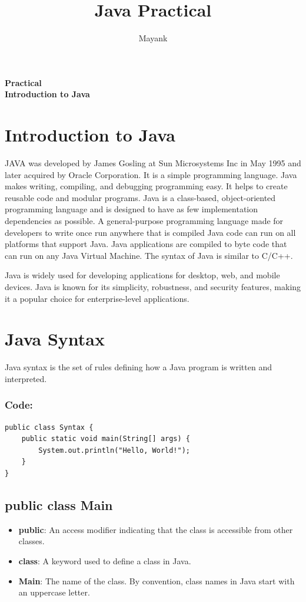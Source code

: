 \documentclass[a4paper,12pt]{article}
\title{\textbf{Java Practical}}
\author{Mayank}
\date{}
\newcounter{practicalno} %
\newcommand{\practicaltitle}[1]{
    \stepcounter{practicalno} %
    \newpage
    \begin{center}
        \vspace{1cm}
        \Large\textbf{Practical \thepracticalno} \\
        \vspace{0.5cm}
        \Large\textbf{#1} %
        \normalsize\vspace{1cm}
    \end{center}
}
\begin{document}
\maketitle

\practicaltitle{Introduction to Java}

\section{Introduction to Java}
JAVA was developed by James Gosling at Sun Microsystems Inc in May 1995 and later acquired by Oracle Corporation. It is a simple programming language. Java makes writing, compiling, and debugging programming easy. It helps to create reusable code and modular programs. Java is a class-based, object-oriented programming language and is designed to have as few implementation dependencies as possible. A general-purpose programming language made for developers to write once run anywhere that is compiled Java code can run on all platforms that support Java. Java applications are compiled to byte code that can run on any Java Virtual Machine. The syntax of Java is similar to C/C++.

Java is widely used for developing applications for desktop, web, and mobile devices. Java is known for its simplicity, robustness, and security features, making it a popular choice for enterprise-level applications.

\section{Java Syntax}
Java syntax is the set of rules defining how a Java program is written and interpreted.
\subsubsection{Code: }
\begin{lstlisting}
public class Syntax {
    public static void main(String[] args) {
        System.out.println("Hello, World!");
    }
}
\end{lstlisting}

\subsection*{public class Main}
\begin{itemize}[leftmargin=2cm]
    \item \textbf{public}: An access modifier indicating that the class is accessible from other classes.
    \item \textbf{class}: A keyword used to define a class in Java.
    \item \textbf{Main}: The name of the class. By convention, class names in Java start with an uppercase letter.
\end{itemize}
\end{document}
